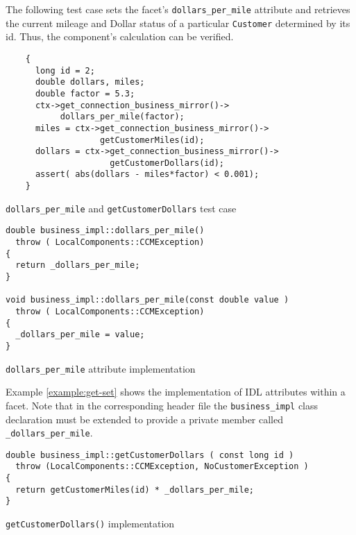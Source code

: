 \newpage
The following test case sets the facet's {\tt dollars\_per\_mile} attribute
and retrieves the current mileage and Dollar status of a particular 
{\tt Customer} determined by its id.
Thus, the component's calculation can be verified.

\begin{Example}
\begin{minifbox}
\begin{small}
\begin{verbatim}
    {
      long id = 2;
      double dollars, miles;
      double factor = 5.3;
      ctx->get_connection_business_mirror()->
           dollars_per_mile(factor);
      miles = ctx->get_connection_business_mirror()->
                   getCustomerMiles(id);
      dollars = ctx->get_connection_business_mirror()->
                     getCustomerDollars(id); 
      assert( abs(dollars - miles*factor) < 0.001);
    }
\end{verbatim}
\end{small}
\end{minifbox}
\caption{{\tt dollars\_per\_mile} and {\tt getCustomerDollars} test case}
\label{example:}
\end{Example}


\begin{Example}
\begin{minifbox}
\begin{small}
\begin{verbatim}
double business_impl::dollars_per_mile()
  throw ( LocalComponents::CCMException)
{
  return _dollars_per_mile;
}

void business_impl::dollars_per_mile(const double value )
  throw ( LocalComponents::CCMException)
{
  _dollars_per_mile = value;
}
\end{verbatim}
\end{small}
\end{minifbox}
\caption{{\tt dollars\_per\_mile} attribute implementation}
\label{example:get-set}
\end{Example}

Example \ref{example:get-set} shows the implementation of IDL attributes within 
a facet.
Note that in the corresponding header file the {\tt business\_impl} class 
declaration must be extended to provide a private member called 
{\tt \_dollars\_per\_mile}. 

\begin{Example}
\begin{minifbox}
\begin{small}
\begin{verbatim}
double business_impl::getCustomerDollars ( const long id )
  throw (LocalComponents::CCMException, NoCustomerException )
{
  return getCustomerMiles(id) * _dollars_per_mile;
}
\end{verbatim}
\end{small}
\end{minifbox}
\caption{{\tt getCustomerDollars()} implementation}
\label{example:getCustomerDollars}
\end{Example}

